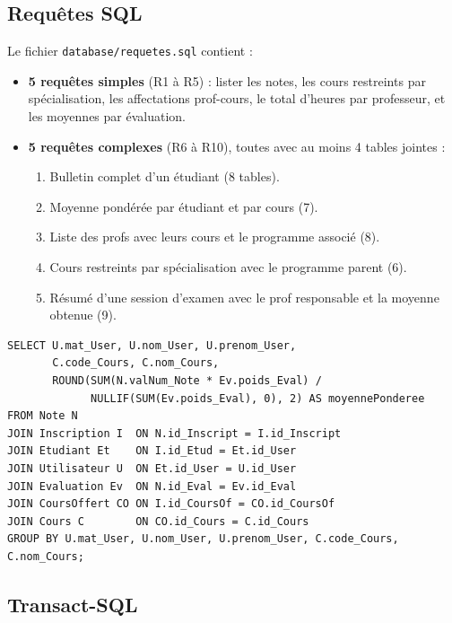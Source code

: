 \documentclass[11pt,a4paper]{article}
\begin{document}
\subsection{Requêtes SQL}

Le fichier \texttt{database/requetes.sql} contient :

\begin{itemize}
    \item \textbf{5 requêtes simples} (R1 à R5) : lister les notes, les
        cours restreints par spécialisation, les affectations prof-cours,
        le total d'heures par professeur, et les moyennes par évaluation.
    \item \textbf{5 requêtes complexes} (R6 à R10), toutes avec au moins
        4 tables jointes :
        \begin{enumerate}
            \item[R6.] Bulletin complet d'un étudiant (8 tables).
            \item[R7.] Moyenne pondérée par étudiant et par cours (7).
            \item[R8.] Liste des profs avec leurs cours et le programme
                associé (8).
            \item[R9.] Cours restreints par spécialisation avec le
                programme parent (6).
            \item[R10.] Résumé d'une session d'examen avec le prof
                responsable et la moyenne obtenue (9).
        \end{enumerate}
\end{itemize}

\begin{lstlisting}[caption={Exemple --- R7 : moyenne pondérée par étudiant et par cours}]
SELECT U.mat_User, U.nom_User, U.prenom_User,
       C.code_Cours, C.nom_Cours,
       ROUND(SUM(N.valNum_Note * Ev.poids_Eval) /
             NULLIF(SUM(Ev.poids_Eval), 0), 2) AS moyennePonderee
FROM Note N
JOIN Inscription I  ON N.id_Inscript = I.id_Inscript
JOIN Etudiant Et    ON I.id_Etud = Et.id_User
JOIN Utilisateur U  ON Et.id_User = U.id_User
JOIN Evaluation Ev  ON N.id_Eval = Ev.id_Eval
JOIN CoursOffert CO ON I.id_CoursOf = CO.id_CoursOf
JOIN Cours C        ON CO.id_Cours = C.id_Cours
GROUP BY U.mat_User, U.nom_User, U.prenom_User, C.code_Cours, C.nom_Cours;
\end{lstlisting}

\subsection{Transact-SQL}
\end{document}
